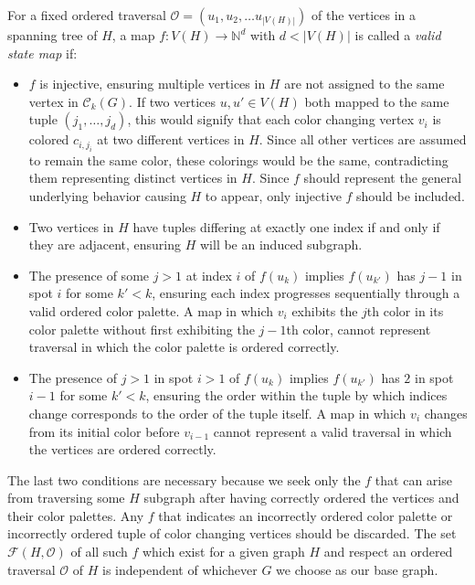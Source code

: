 \documentclass[12pt,reqno,dvipsnames]{amsart}
\theoremstyle{definition}
\begin{document}
For a fixed ordered traversal $\mathcal{O}=(u_1, u_2,\dots u_{|V(H)|})$ of the vertices in a spanning tree of $H$, a map $f\colon V(H) \to \mathbb{N}^d$ with $d<|V(H)|$ is called a \emph{valid state map} if:
\begin{itemize}
    \item $f$ is injective, ensuring multiple vertices in $H$ are not assigned to the same vertex in $\mathcal{C}_k(G)$. If two vertices $u,u'\in V(H)$ both mapped to the same tuple $(j_1,\dots,j_d)$, this would signify that each color changing vertex $v_i$ is colored $c_{i,j_i}$ at two different vertices in $H$. Since all other vertices are assumed to remain the same color, these colorings would be the same, contradicting them representing distinct vertices in $H$. Since $f$ should represent the general underlying behavior causing $H$ to appear, only injective $f$ should be included.
    \item Two vertices in $H$ have tuples differing at exactly one index if and only if they are adjacent, ensuring $H$ will be an induced subgraph. 
    \item The presence of some $j>1$ at index $i$ of $f(u_k)$ implies $f(u_{k'})$ has $j-1$ in spot $i$ for some $k'<k$, ensuring each index progresses sequentially through a valid ordered color palette. A map in which $v_i$ exhibits the $j$th color in its color palette without first exhibiting the $j-1$th color, cannot represent traversal in which the color palette is ordered correctly.
    \item The presence of $j>1$ in spot $i>1$ of $f(u_k)$ implies $f(u_{k'})$ has $2$ in spot $i-1$ for some $k'<k$, ensuring the order within the tuple by which indices change corresponds to the order of the tuple itself. A map in which $v_i$ changes from its initial color before $v_{i-1}$ cannot represent a valid traversal in which the vertices are ordered correctly.
\end{itemize}
The last two conditions are necessary because we seek only the $f$ that can arise from traversing some $H$ subgraph after having correctly ordered the vertices and their color palettes. Any $f$ that indicates an incorrectly ordered color palette or incorrectly ordered tuple of color changing vertices should be discarded.
The set $\mathcal{F}(H,\mathcal{O})$ of all such $f$ which exist for a given graph $H$ and respect an ordered traversal $\mathcal{O}$ of $H$ is independent of whichever $G$ we choose as our base graph. 
\end{document}
